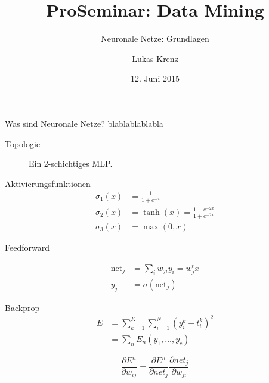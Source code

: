 \documentclass[10pt, compress, xetex]{beamer}
\title{ProSeminar: Data Mining}
\subtitle{Neuronale Netze: Grundlagen}
\author{Lukas Krenz}
\date{12. Juni 2015}
\institute{Technische Universität München}
\begin{document}
\begin{frame}
\titlepage
\end{frame}


\begin{frame}{Was sind Neuronale Netze?}
	blablablablabla
\end{frame}

\begin{frame}{Topologie}
\begin{figure}[ht!]
\label{fig:MLP}
  \centering
    
  \caption{Ein 2-schichtiges MLP.}
\end{figure}

\end{frame}

\begin{frame}{Aktivierungsfunktionen}
\begin{align}
	\sigma_1(x) & =  \frac{1}{1+e^{-x}} \\
	\sigma_2(x) & =  \tanh(x) = \frac{1-e^{-2x}}{1+e^{-2x}} \\
	\sigma_3(x) & =  \max(0,x)
\end{align}
\end{frame}

\begin{frame}{Feedforward}
\begin{figure}[ht!]
\label{fig:MLP}
  \centering
\end{figure}

\begin{align}
	\text{net}_j & = \sum_{i} w_{ji} y_i = w_j^t x \\
	y_j & = \sigma (\text{net}_j)
\end{align} 
\end{frame}

\begin{frame}{Backprop}
\begin{align}
	E &= \sum_{k=1}^K \sum_{i=1}^N \left( y_i^k - t_i^k \right)^2 \\
	& =  \sum_n E_n(y_1, \ldots, y_c)
\end{align}

\begin{equation}
\frac{\partial E^n}{\partial w_{ij}} = \frac{\partial E^n}{\partial net_j}  \frac{\partial net_j }{\partial w_{ji}}
\end{equation}

\end{frame}
\end{document}
